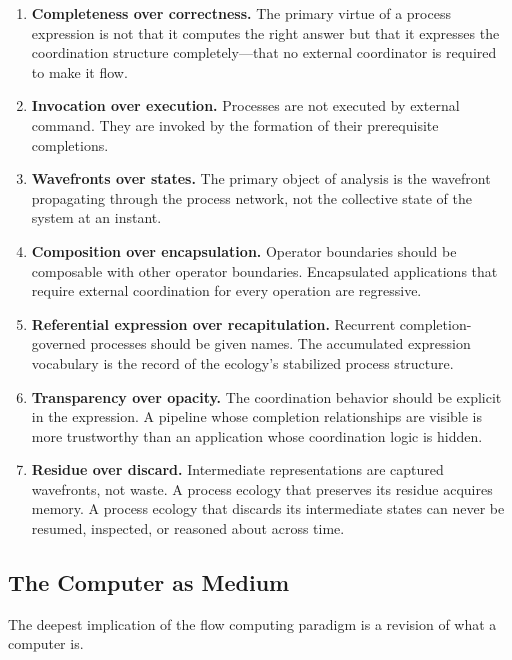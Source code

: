 \documentclass[12pt, a4paper]{article}
\begin{document}
\begin{enumerate}
\item \textbf{Completeness over correctness.} The primary virtue of
  a process expression is not that it computes the right answer but
  that it expresses the coordination structure completely---that no
  external coordinator is required to make it flow.

\item \textbf{Invocation over execution.} Processes are not executed
  by external command. They are invoked by the formation of their
  prerequisite completions.

\item \textbf{Wavefronts over states.} The primary object of analysis
  is the wavefront propagating through the process network, not the
  collective state of the system at an instant.

\item \textbf{Composition over encapsulation.} Operator boundaries
  should be composable with other operator boundaries. Encapsulated
  applications that require external coordination for every operation
  are regressive.

\item \textbf{Referential expression over recapitulation.}
  Recurrent completion-governed processes should be given names.
  The accumulated expression vocabulary is the record of the ecology's
  stabilized process structure.

\item \textbf{Transparency over opacity.} The coordination behavior
  should be explicit in the expression. A pipeline whose completion
  relationships are visible is more trustworthy than an application
  whose coordination logic is hidden.

\item \textbf{Residue over discard.} Intermediate representations
  are captured wavefronts, not waste. A process ecology that
  preserves its residue acquires memory. A process ecology that
  discards its intermediate states can never be resumed, inspected,
  or reasoned about across time.
\end{enumerate}

\subsection{The Computer as Medium}

The deepest implication of the flow computing paradigm is a revision
of what a computer is.
\end{document}
